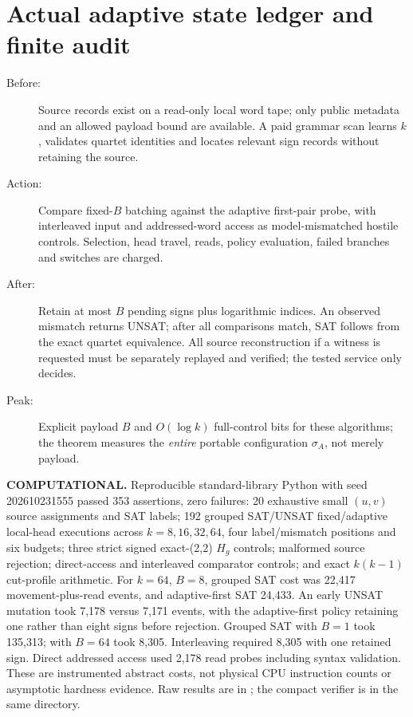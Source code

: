 \documentclass[11pt]{article}
\begin{document}
\section{Actual adaptive state ledger and finite audit}
\begin{description}
\item[Before:] Source records exist on a read-only local word tape; only public metadata and an allowed payload bound are available. A paid grammar scan learns $k$, validates quartet identities and locates relevant sign records without retaining the source.
\item[Action:] Compare fixed-$B$ batching against the adaptive first-pair probe, with interleaved input and addressed-word access as model-mismatched hostile controls. Selection, head travel, reads, policy evaluation, failed branches and switches are charged.
\item[After:] Retain at most $B$ pending signs plus logarithmic indices. An observed mismatch returns UNSAT; after all comparisons match, SAT follows from the exact quartet equivalence. All source reconstruction if a witness is requested must be separately replayed and verified; the tested service only decides.
\item[Peak:] Explicit payload $B$ and $O(\log k)$ full-control bits for these algorithms; the theorem measures the \emph{entire} portable configuration $\sigma_A$, not merely payload.
\end{description}
\noindent\textbf{COMPUTATIONAL.} Reproducible standard-library Python with seed 202610231555 passed 353 assertions, zero failures: 20 exhaustive small $(u,v)$ source assignments and SAT labels; 192 grouped SAT/UNSAT fixed/adaptive local-head executions across $k=8,16,32,64$, four label/mismatch positions and six budgets; three strict signed exact-(2,2) $H_g$ controls; malformed source rejection; direct-access and interleaved comparator controls; and exact $k(k-1)$ cut-profile arithmetic.
For $k=64$, $B=8$, grouped SAT cost was 22,417 movement-plus-read events, and adaptive-first SAT 24,433. An early UNSAT mutation took 7,178 versus 7,171 events, with the adaptive-first policy retaining one rather than eight signs before rejection. Grouped SAT with $B=1$ took 135,313; with $B=64$ took 8,305. Interleaving required 8,305 with one retained sign. Direct addressed access used 2,178 read probes including syntax validation. These are instrumented abstract costs, not physical CPU instruction counts or asymptotic hardness evidence.
Raw results are in ; the compact verifier is in the same directory.
\end{document}
